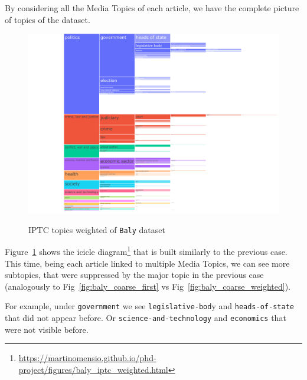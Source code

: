 By considering all the Media Topics of each article, we have the complete picture of topics of the dataset. 

\begin{figure}[!htbp]
    \centering
    \href{https://martinomensio.github.io/phd-project/figures/baly_iptc_weighted.html}{\includegraphics[trim={2.65cm 0cm 2.8cm 0cm},clip,width=\linewidth]{figures/baly_iptc_weighted.pdf}}
    \caption{IPTC topics weighted of \texttt{Baly} dataset}
    \label{fig:baly_iptc_weighted}
\end{figure}

Figure~\ref{fig:baly_iptc_weighted}
shows the icicle diagram\footnote{\url{https://martinomensio.github.io/phd-project/figures/baly_iptc_weighted.html}} that is built similarly to the previous case. This time, being each article linked to multiple Media Topics, we can see more subtopics, that were suppressed by the major topic in the previous case (analogously to Fig~\ref{fig:baly_coarse_first} vs Fig~\ref{fig:baly_coarse_weighted}).

For example, under \texttt{government} we see \texttt{legislative-bod}y and \texttt{heads-of-state} that did not appear before. Or \texttt{science-and-technology} and \texttt{economics} that were not visible before.



